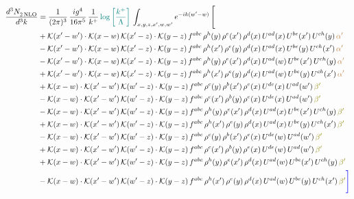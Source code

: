 \documentclass[9pt]{article}
\numberwithin{equation}{section}
\begin{document}
\begin{align}
  \frac{d^{3}N_{2\,\rm NLO}^{\rm}}{d^{3}k}  & = \frac{1}{(2\pi)^{3}}\, \frac{ig^{4}}{16\pi^{5}}\, \frac{1}{k^{+}}\, {\color{teal}\log{\left[\frac{k^{+}}{\Lambda}\right]}}\, \int_{x,y,z,x^{\prime},w,w^{\prime}}e^{-ik(w^{\prime}-w)}\, \Bigg[\notag \\ &   +\mathcal{K}(x'-w')\cdot\mathcal{K}(x-w)\,\mathcal{K}(x'-z)\cdot\mathcal{K}(y-z)\, f^{abc}\,\rho^{h}(y)\,\rho^{e}(x')\,\rho^{d}(x)\,U^{ad}(x)\,U^{be}(x')\,U^{ch}(y)\,{\color{brown}\alpha'}\notag\\ &-\mathcal{K}(x'-w')\cdot\mathcal{K}(x-w)\,\mathcal{K}(x'-z)\cdot\mathcal{K}(y-z)\, f^{abc}\,\rho^{h}(x')\,\rho^{e}(y)\,\rho^{d}(x)\,U^{ad}(x)\,U^{be}(y)\,U^{ch}(x')\,{\color{brown}\alpha'}\notag\\ &-\mathcal{K}(x'-w')\cdot\mathcal{K}(x-w)\,\mathcal{K}(x'-z)\cdot\mathcal{K}(y-z)\, f^{abc}\,\rho^{h}(y)\,\rho^{e}(x')\,\rho^{d}(x)\,U^{ad}(w)\,U^{be}(x')\,U^{ch}(y)\,{\color{brown}\alpha'}\notag \\ &+\mathcal{K}(x'-w')\cdot\mathcal{K}(x-w)\,\mathcal{K}(x'-z)\cdot\mathcal{K}(y-z)\, f^{abc}\,\rho^{h}(x')\,\rho^{e}(y)\,\rho^{d}(x)\,U^{ad}(w)\,U^{be}(y)\,U^{ch}(x')\,{\color{brown}\alpha'}\notag \\ & +\mathcal{K}(x-w)\cdot\mathcal{K}(x'-w')\,\mathcal{K}(w'-z)\cdot\mathcal{K}(y-z)\, f^{abc}\,\rho^{c}(y)\,\rho^{b}(x')\,\rho^{e}(x)\,U^{de}(x)\,U^{ad}(w')\,{\color{olive}\beta'}\notag \\ &-\mathcal{K}(x-w)\cdot\mathcal{K}(x'-w')\,\mathcal{K}(w'-z)\cdot\mathcal{K}(y-z)\, f^{abc}\,\rho^{c}(x')\,\rho^{b}(y)\,\rho^{e}(x)\,U^{de}(x)\,U^{ad}(w')\,{\color{olive}\beta'}\notag \\ & -\mathcal{K}(x-w)\cdot\mathcal{K}(x'-w')\,\mathcal{K}(w'-z)\cdot\mathcal{K}(y-z)\, f^{abc}\,\rho^{h}(y)\,\rho^{e}(x')\,\rho^{d}(x)\,U^{ad}(x)\,U^{be}(x')\,U^{ch}(y)\,{\color{olive}\beta'}\notag\\ &+\mathcal{K}(x-w)\cdot\mathcal{K}(x'-w')\,\mathcal{K}(w'-z)\cdot\mathcal{K}(y-z)\, f^{abc}\,\rho^{h}(x')\,\rho^{e}(y)\,\rho^{d}(x)\,U^{ad}(x)\,U^{be}(y)\,U^{ch}(x')\,{\color{olive}\beta'}\notag\\ &-\mathcal{K}(x-w)\cdot\mathcal{K}(x'-w')\,\mathcal{K}(w'-z)\cdot\mathcal{K}(y-z)\, f^{abc}\,\rho^{c}(y)\,\rho^{b}(x')\,\rho^{e}(x)\,U^{de}(w)\,U^{ad}(w')\,{\color{olive}\beta'}\notag\\ &+\mathcal{K}(x-w)\cdot\mathcal{K}(x'-w')\,\mathcal{K}(w'-z)\cdot\mathcal{K}(y-z)\, f^{abc}\,\rho^{c}(x')\,\rho^{b}(y)\,\rho^{e}(x)\,U^{de}(w)\,U^{ad}(w')\,{\color{olive}\beta'}\notag\\ &+\mathcal{K}(x-w)\cdot\mathcal{K}(x'-w')\,\mathcal{K}(w'-z)\cdot\mathcal{K}(y-z)\, f^{abc}\,\rho^{h}(y)\,\rho^{e}(x')\,\rho^{d}(x)\,U^{ad}(w)\,U^{be}(x')\,U^{ch}(y)\,{\color{olive}\beta'}\notag \\ &-\mathcal{K}(x-w)\cdot\mathcal{K}(x'-w')\,\mathcal{K}(w'-z)\cdot\mathcal{K}(y-z)\, f^{abc}\,\rho^{h}(x')\,\rho^{e}(y)\,\rho^{d}(x)\,U^{ad}(w)\,U^{be}(y)\,U^{ch}(x')\,{\color{olive}\beta'}{\color{blue}\Bigg]}
\end{align}  
\end{document}
